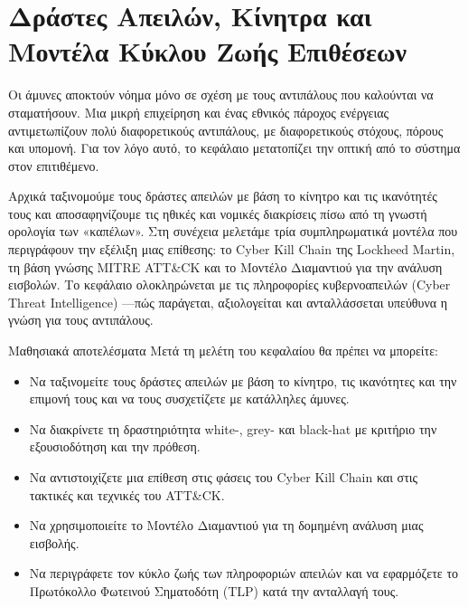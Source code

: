 \chapter{Δράστες Απειλών, Κίνητρα και Μοντέλα Κύκλου Ζωής Επιθέσεων}\label{ch:3}

Οι άμυνες αποκτούν νόημα μόνο σε σχέση με τους αντιπάλους που καλούνται να σταματήσουν. Μια μικρή επιχείρηση και ένας εθνικός πάροχος ενέργειας αντιμετωπίζουν πολύ διαφορετικούς αντιπάλους, με διαφορετικούς στόχους, πόρους και υπομονή. Για τον λόγο αυτό, το κεφάλαιο μετατοπίζει την οπτική από το σύστημα στον επιτιθέμενο.

Αρχικά ταξινομούμε τους δράστες απειλών με βάση το κίνητρο και τις ικανότητές τους και αποσαφηνίζουμε τις ηθικές και νομικές διακρίσεις πίσω από τη γνωστή ορολογία των «καπέλων». Στη συνέχεια μελετάμε τρία συμπληρωματικά μοντέλα που περιγράφουν την εξέλιξη μιας επίθεσης: το Cyber Kill Chain της Lockheed Martin, τη βάση γνώσης MITRE ATT\&CK και το Μοντέλο Διαμαντιού για την ανάλυση εισβολών. Το κεφάλαιο ολοκληρώνεται με τις πληροφορίες κυβερνοαπειλών (Cyber Threat Intelligence) —πώς παράγεται, αξιολογείται και ανταλλάσσεται υπεύθυνα η γνώση για τους αντιπάλους.

\begin{outcomesbox}{Μαθησιακά αποτελέσματα}
Μετά τη μελέτη του κεφαλαίου θα πρέπει να μπορείτε:
\begin{itemize}
  \item Να ταξινομείτε τους δράστες απειλών με βάση το κίνητρο, τις ικανότητες και την επιμονή τους και να τους συσχετίζετε με κατάλληλες άμυνες.
  \item Να διακρίνετε τη δραστηριότητα white-, grey- και black-hat με κριτήριο την εξουσιοδότηση και την πρόθεση.
  \item Να αντιστοιχίζετε μια επίθεση στις φάσεις του Cyber Kill Chain και στις τακτικές και τεχνικές του ATT\&CK.
  \item Να χρησιμοποιείτε το Μοντέλο Διαμαντιού για τη δομημένη ανάλυση μιας εισβολής.
  \item Να περιγράφετε τον κύκλο ζωής των πληροφοριών απειλών και να εφαρμόζετε το Πρωτόκολλο Φωτεινού Σηματοδότη (TLP) κατά την ανταλλαγή τους.
\end{itemize}
\end{outcomesbox}

